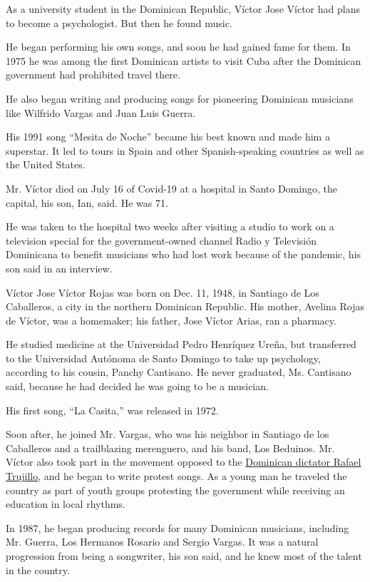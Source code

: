As a university student in the Dominican Republic, Víctor Jose Víctor
had plans to become a psychologist. But then he found music.

He began performing his own songs, and soon he had gained fame for them.
In 1975 he was among the first Dominican artists to visit Cuba after the
Dominican government had prohibited travel there.

He also began writing and producing songs for pioneering Dominican
musicians like Wilfrido Vargas and Juan Luis Guerra.

His 1991 song ``Mesita de Noche'' became his best known and made him a
superstar. It led to tours in Spain and other Spanish-speaking countries
as well as the United States.

Mr. Víctor died on July 16 of Covid-19 at a hospital in Santo Domingo,
the capital, his son, Ian, said. He was 71.

He was taken to the hospital two weeks after visiting a studio to work
on a television special for the government-owned channel Radio y
Televisión Dominicana to benefit musicians who had lost work because of
the pandemic, his son said in an interview.

Víctor Jose Víctor Rojas was born on Dec. 11, 1948, in Santiago de Los
Caballeros, a city in the northern Dominican Republic. His mother,
Avelina Rojas de Víctor, was a homemaker; his father, Jose Víctor Arias,
ran a pharmacy.

He studied medicine at the Universidad Pedro Henríquez Ureña, but
transferred to the Universidad Autónoma de Santo Domingo to take up
psychology, according to his cousin, Panchy Cantisano. He never
graduated, Ms. Cantisano said, because he had decided he was going to be
a musician.

His first song, ``La Casita,'' was released in 1972.

Soon after, he joined Mr. Vargas, who was his neighbor in Santiago de
los Caballeros and a trailblazing merenguero, and his band, Los
Beduinos. Mr. Víctor also took part in the movement opposed to the
\href{https://www.nytimes.com/1959/07/06/archives/dominican-dictator-rafael-leonidas-trujillo-molina.html}{Dominican
dictator Rafael Trujillo}, and he began to write protest songs. As a
young man he traveled the country as part of youth groups protesting the
government while receiving an education in local rhythms.

In 1987, he began producing records for many Dominican musicians,
including Mr. Guerra, Los Hermanos Rosario and Sergio Vargas. It was a
natural progression from being a songwriter, his son said, and he knew
most of the talent in the country.

